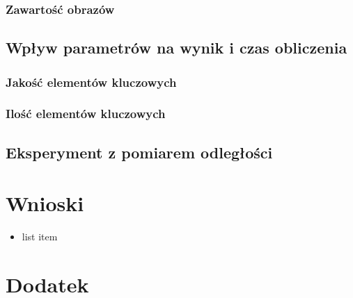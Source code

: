 \documentclass[eng,printmode]{mgr}
\begin{document}
\subsection{Zawartość obrazów}
\section{Wpływ parametrów na wynik i czas obliczenia}
\subsection{Jakość elementów kluczowych}
\subsection{Ilość elementów kluczowych}
\section{Eksperyment z pomiarem odległości}

\chapter{Wnioski}

\begin{itemize}
\item list item
\end{itemize}


\appendix
\chapter{Dodatek}


\end{document}
